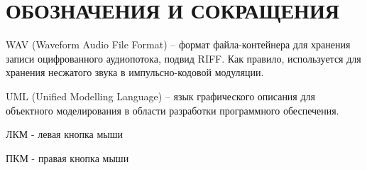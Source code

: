 \section*{ОБОЗНАЧЕНИЯ И СОКРАЩЕНИЯ}

WAV (Waveform Audio File Format) -- формат файла-контейнера для хранения записи оцифрованного аудиопотока, подвид RIFF. Как правило, используется для хранения несжатого звука в импульсно-кодовой модуляции.

UML (Unified Modelling Language) -- язык графического описания для объектного моделирования в области разработки программного обеспечения.

ЛКМ - левая кнопка мыши

ПКМ - правая кнопка мыши
